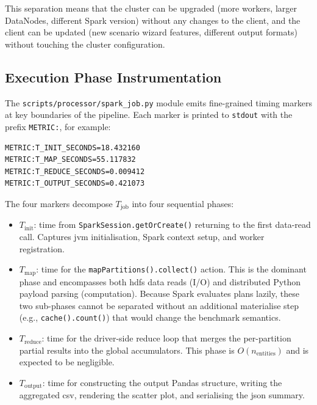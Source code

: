 This separation means that the cluster can be upgraded (more workers, larger DataNodes, different
Spark version) without any changes to the client, and the client can be updated (new scenario
wizard features, different output formats) without touching the cluster configuration.

\subsection{Execution Phase Instrumentation}
\label{subsec:rm-phase-instrumentation}

The \texttt{scripts/processor/spark\_job.py} module emits fine-grained timing markers at
key boundaries of the pipeline.  Each marker is printed to \texttt{stdout} with the prefix
\texttt{METRIC:}, for example:

\begin{verbatim}
METRIC:T_INIT_SECONDS=18.432160
METRIC:T_MAP_SECONDS=55.117832
METRIC:T_REDUCE_SECONDS=0.009412
METRIC:T_OUTPUT_SECONDS=0.421073
\end{verbatim}

The four markers decompose $T_{\text{job}}$ into four sequential phases:

\begin{itemize}
  \item $T_{\text{init}}$: time from \texttt{SparkSession.getOrCreate()} returning
        to the first data-read call.  Captures \gls{jvm} initialisation, Spark context
        setup, and worker registration.
  \item $T_{\text{map}}$: time for the \texttt{mapPartitions().collect()} action.
        This is the dominant phase and encompasses both \gls{hdfs} data reads (I/O) and
        distributed Python payload parsing (computation).  Because Spark evaluates plans
        lazily, these two sub-phases cannot be separated without an additional materialise
        step (e.g., \texttt{cache().count()}) that would change the benchmark semantics.
  \item $T_{\text{reduce}}$: time for the driver-side reduce loop that merges the
        per-partition partial results into the global accumulators.  This phase is
        $O(n_{\text{entities}})$ and is expected to be negligible.
  \item $T_{\text{output}}$: time for constructing the output Pandas structure,
        writing the aggregated \gls{csv}, rendering the scatter plot, and serialising the
        \gls{json} summary.
\end{itemize}

